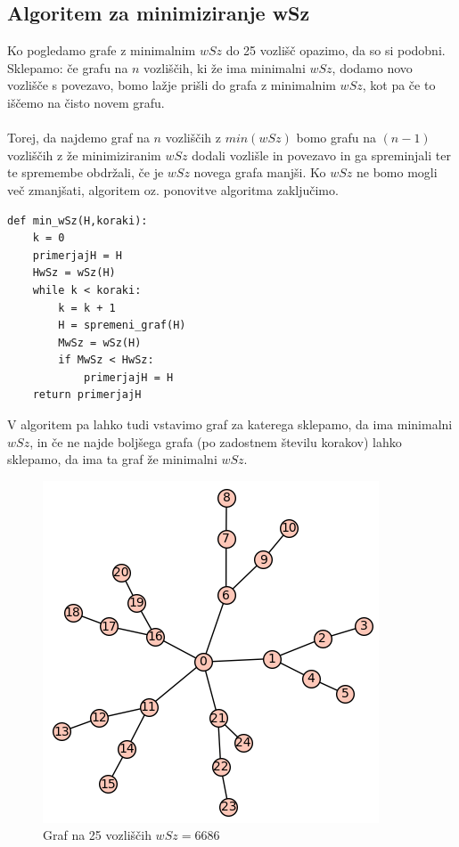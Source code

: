 \documentclass[12pt, a4paper]{article}
\begin{document}
\newpage

\subsection[Algoritem za minimiziranje wSz]{Algoritem za minimiziranje wSz}

Ko pogledamo grafe z minimalnim $wSz$ do 25 vozlišč opazimo, da so si podobni. Sklepamo: če grafu na $n$ vozliščih, ki že ima minimalni $wSz$, dodamo novo vozlišče s povezavo, bomo lažje prišli do grafa z minimalnim $wSz$, kot pa če to iščemo na čisto novem grafu.\\
\\
Torej, da najdemo graf na $n$ vozliščih z $min(wSz)$ bomo grafu na $(n-1)$ vozliščih z že minimiziranim $wSz$ dodali vozlišle in povezavo in ga spreminjali ter te spremembe obdržali, če je $wSz$ novega grafa manjši. Ko $wSz$ ne bomo mogli več zmanjšati, algoritem oz. ponovitve algoritma zaključimo.

\begin{verbatim}
def min_wSz(H,koraki):
    k = 0
    primerjajH = H
    HwSz = wSz(H)
    while k < koraki:
        k = k + 1
        H = spremeni_graf(H)
        MwSz = wSz(H)
        if MwSz < HwSz:
            primerjajH = H
    return primerjajH
\end{verbatim}

V algoritem pa lahko tudi vstavimo graf za katerega sklepamo, da ima minimalni $wSz$, in če ne najde boljšega grafa (po zadostnem številu korakov)  lahko sklepamo, da ima ta graf že minimalni $wSz$.

\begin{figure}[h]
\centering
\includegraphics[scale=0.7]{koncni_graf25}
\caption{Graf na 25 vozliščih $wSz = 6686$}
\end{figure}
\end{document}
